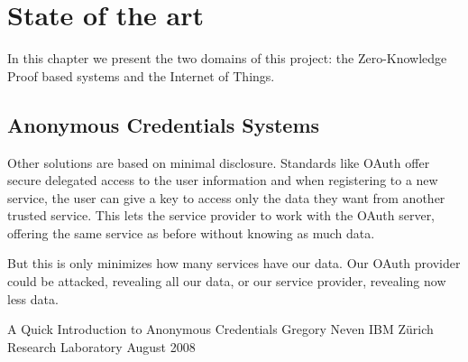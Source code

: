 \chapter{State of the art}\label{ch:stateoftheart}

In this chapter we present the two domains of this project: the Zero-Knowledge Proof based systems and the Internet of Things.


\section{Anonymous Credentials Systems}

Other solutions are based on minimal disclosure. Standards like OAuth offer secure delegated access to the user information and when registering to a new service, the user can give a key to access only the data they want from another trusted service. This lets the service provider to work with the OAuth server, offering the same service as before without knowing as much data.

But this is only minimizes how many services have our data. Our OAuth provider could be attacked, revealing all our data, or our service provider, revealing now less data.


A Quick Introduction to
Anonymous Credentials
Gregory Neven
IBM Zürich Research Laboratory
August 2008


